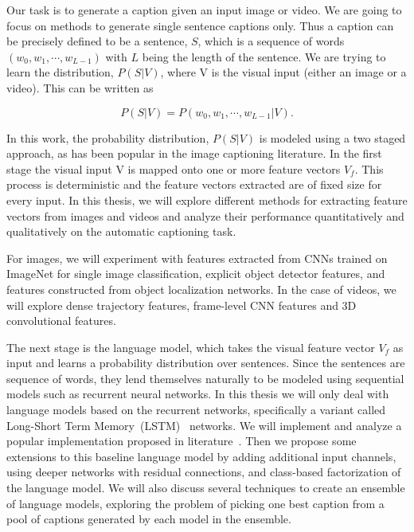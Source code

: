 Our task is to generate a caption given an input image or video. 
We are going to focus on methods to generate single sentence captions only. 
Thus a caption can be precisely defined to be a sentence, $S$, which is a
sequence of words $(w_0, w_1,\cdots, w_{L-1})$ with $L$ being the length of the
sentence. 
We are trying to learn the distribution, $P(S|V)$, where V is the visual
input (either an image or a video). 
This can be written as 

\begin{equation}
\label{eq:langB1} P(S|V) = P(w_0, w_1, \cdots, w_{L-1}|V)  .
\end{equation}

In this work, the probability distribution, $P(S|V)$ is modeled using a two
staged approach, as has been popular in the image captioning literature. 
In the first stage the visual input V is mapped onto one or more feature
vectors $V_f$.
This process is deterministic and the feature vectors extracted are of fixed
size for every input. 
In this thesis, we will explore different methods for extracting feature
vectors from images and videos and analyze their performance quantitatively and
qualitatively on the automatic captioning task. 

For images, we will experiment with features extracted from CNNs trained on
ImageNet for single image classification, explicit object detector features, and
features constructed from object localization networks.
In the case of videos, we will explore dense trajectory features, frame-level
CNN features and 3D convolutional features. 

The next stage is the language model, which takes the visual feature vector
$V_f$ as input and learns a probability distribution over sentences.
Since the sentences are sequence of words, they lend themselves naturally to be
modeled using sequential models such as recurrent neural networks.
In this thesis we will only deal with language models based on the recurrent
networks, specifically a variant called Long-Short Term
Memory~(LSTM)~\cite{Hochreiter1997} networks.
We will implement and analyze a popular implementation proposed in
literature~\cite{Vinyals_2015_CVPR}.
Then we propose some extensions to this baseline language model by adding
additional input channels, using deeper networks with residual connections,
and class-based factorization of the language model. 
We will also discuss several techniques to create an ensemble of language
models, exploring the problem of picking one best caption from a pool of
captions generated by each model in the ensemble.

